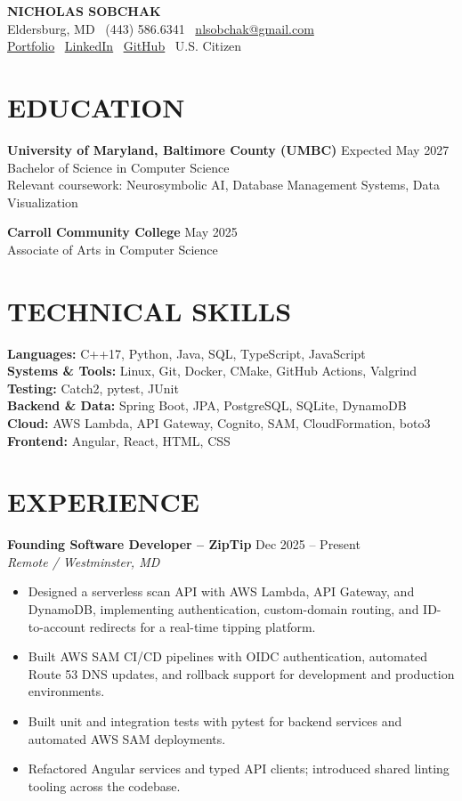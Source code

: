 \documentclass[10pt,letterpaper]{article}
\begin{document}
{\LARGE \textbf{\color{accent} NICHOLAS SOBCHAK}}\\
Eldersburg, MD \textbar\ (443) 586.6341 \textbar\ \href{mailto:nlsobchak@gmail.com}{nlsobchak@gmail.com}\\
\underline{\href{https://nickczak.github.io/portfolio/}{Portfolio}} \textbar\
\underline{\href{https://linkedin.com/in/nicholas-sobchak-b4aa2a329}{LinkedIn}} \textbar\
\underline{\href{https://github.com/nickczak}{GitHub}} \textbar\ U.S. Citizen

\section*{EDUCATION}
\textbf{University of Maryland, Baltimore County (UMBC)} \hfill Expected May 2027\\
Bachelor of Science in Computer Science\\
Relevant coursework: Neurosymbolic AI, Database Management Systems, Data Visualization

\textbf{Carroll Community College} \hfill May 2025\\
Associate of Arts in Computer Science

\section*{TECHNICAL SKILLS}
\textbf{Languages:} C++17, Python, Java, SQL, TypeScript, JavaScript \\
\textbf{Systems \& Tools:} Linux, Git, Docker, CMake, GitHub Actions, Valgrind \\
\textbf{Testing:} Catch2, pytest, JUnit \\
\textbf{Backend \& Data:} Spring Boot, JPA, PostgreSQL, SQLite, DynamoDB \\
\textbf{Cloud:} AWS Lambda, API Gateway, Cognito, SAM, CloudFormation, boto3 \\
\textbf{Frontend:} Angular, React, HTML, CSS

\section*{EXPERIENCE}
\textbf{Founding Software Developer -- ZipTip} \hfill Dec 2025 -- Present\\
\textit{Remote / Westminster, MD}
\begin{itemize}
  \item Designed a serverless scan API with AWS Lambda, API Gateway, and DynamoDB, implementing authentication, custom-domain routing, and ID-to-account redirects for a real-time tipping platform.
  \item Built AWS SAM CI/CD pipelines with OIDC authentication, automated Route 53 DNS updates, and rollback support for development and production environments.
  \item Built unit and integration tests with pytest for backend services and automated AWS SAM deployments.
  \item Refactored Angular services and typed API clients; introduced shared linting tooling across the codebase.
\end{itemize}
\end{document}
